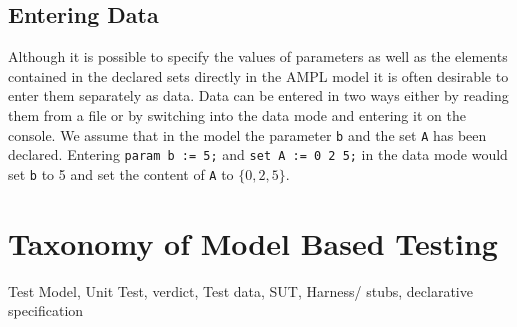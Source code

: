 \subsection{Entering Data}
Although it is possible to specify the values of parameters as well as the elements contained in the declared sets directly in the AMPL model it is often desirable to enter them separately as data. Data can be entered in two ways either by reading them from a file or by switching into the data mode and entering it on the console. We assume that in the model the parameter \verb=b= and the set \verb=A= has been declared. Entering \verb&param b := 5;& and \verb&set A := 0 2 5;& in the data mode would set \verb=b= to 5 and set the content of \verb=A= to $\lbrace 0,2,5\rbrace$.


\section{Taxonomy of Model Based Testing}
Test Model,
Unit Test,
verdict,
Test data,
SUT,
Harness/ stubs,
declarative specification
